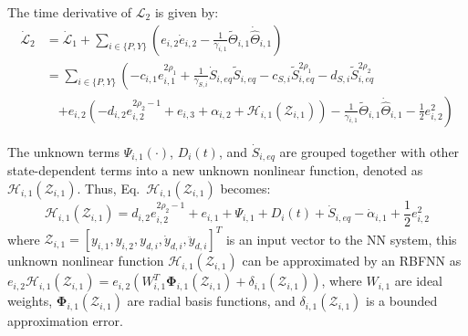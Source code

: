 The time derivative of $\mathcal{L}_2$ is given by:
\begin{align}
    \dot{\mathcal{L}}_2 &= \dot{\mathcal{L}}_1 + \sum_{i \in \{P,Y\}} \left( e_{i,2} \dot{e}_{i,2} - \frac{1}{\gamma_{i,1}} \widetilde{\Theta}_{i,1} \dot{\widehat{\Theta}}_{i,1} \right) \nonumber \\
    &= \sum_{i \in \{P,Y\}} \left( -c_{i,1} e_{i,1}^{2\rho_1} + \frac{1}{\gamma_{S,i}} \dot{S}_{i,eq} \widetilde{S}_{i,eq} - c_{S,i} \widetilde{S}_{i,eq}^{2\rho_1} - d_{S,i} \widetilde{S}_{i,eq}^{2\rho_2} \right. \nonumber \\
    &\quad \left. + e_{i,2} ( - d_{i,2} e_{i,2}^{2\rho_2-1} + e_{i,3} + \alpha_{i,2} + \mathcal{H}_{i,1}(\mathcal{Z}_{i,1})) - \frac{1}{\gamma_{i,1}} \widetilde{\Theta}_{i,1} \dot{\widehat{\Theta}}_{i,1} - \frac{1}{2} e_{i,2}^2 \right) \label{eq:L2_dot_expanded}
\end{align}

The unknown terms $\Psi_{i,1}(\cdot)$, $D_i(t)$, and $\dot{S}_{i,eq}$ are grouped together with other state-dependent terms into a new unknown nonlinear function, denoted as $\mathcal{H}_{i,1}(\mathcal{Z}_{i,1})$. Thus, Eq.~$\mathcal{H}_{i,1}(\mathcal{Z}_{i,1})$ becomes:
\begin{equation}
    \mathcal{H}_{i,1}(\mathcal{Z}_{i,1}) = d_{i,2} e_{i,2}^{2\rho_2-1} + e_{i,1} +  \Psi_{i,1} + D_i(t) + \dot{S}_{i,eq} - \dot{\alpha}_{i,1}    +\frac{1}{2} e^2_{i,2}\label{eq:e2_dot_H1}
\end{equation}
where $\mathcal{Z}_{i,1} = [y_{i,1},y_{i,2},y_{d,i},\dot{y}_{d,i},\ddot{y}_{d,i}]^T$ is an input vector to the NN system, this unknown nonlinear function $\mathcal{H}_{i,1}(\mathcal{Z}_{i,1})$ can be approximated by an RBFNN as $e_{i,2} \mathcal{H}_{i,1}(\mathcal{Z}_{i,1}) =e_{i,2} \left( W_{i,1}^T \mathbf{\Phi}_{i,1}(\mathcal{Z}_{i,1}) + \delta_{i,1}(\mathcal{Z}_{i,1}) \right)$, where $W_{i,1}$ are ideal weights, $\mathbf{\Phi}_{i,1}(\mathcal{Z}_{i,1})$ are radial basis functions, and $\delta_{i,1}(\mathcal{Z}_{i,1})$ is a bounded approximation error.

